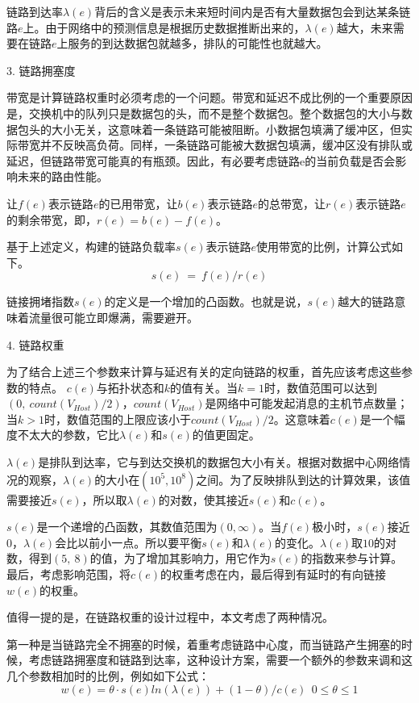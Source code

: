链路到达率$\lambda(e)$背后的含义是表示未来短时间内是否有大量数据包会到达某条链路$e$上。由于网络中的预测信息是根据历史数据推断出来的，$\lambda(e)$越大，未来需要在链路$e$上服务的到达数据包就越多，排队的可能性也就越大。

3. 链路拥塞度

带宽是计算链路权重时必须考虑的一个问题。带宽和延迟不成比例的一个重要原因是，交换机中的队列只是数据包的头，而不是整个数据包。整个数据包的大小与数据包头的大小无关，这意味着一条链路可能被阻断。小数据包填满了缓冲区，但实际带宽并不反映高负荷。同样，一条链路可能被大数据包填满，缓冲区没有排队或延迟，但链路带宽可能真的有瓶颈。因此，有必要考虑链路e的当前负载是否会影响未来的路由性能。

让$f(e)$表示链路$e$的已用带宽，让$b(e)$表示链路$e$的总带宽，让$r(e)$表示链路$e$的剩余带宽，即，$r(e)=b(e)-f(e)$。

基于上述定义，构建的链路负载率$s(e)$表示链路$e$使用带宽的比例，计算公式如下。
$$s(e)\ =\ f(e)/r(e)$$

链接拥堵指数$s(e)$的定义是一个增加的凸函数。也就是说，$s(e)$越大的链路意味着流量很可能立即爆满，需要避开。

4. 链路权重

为了结合上述三个参数来计算与延迟有关的定向链路的权重，首先应该考虑这些参数的特点。
$c(e)$与拓扑状态和$k$的值有关。当$k=1$时，数值范围可以达到$(0,\ count(V_{Host})/2)，count(V_{Host})$是网络中可能发起消息的主机节点数量；当$k>1$时，数值范围的上限应该小于$count(V_{Host})/2$。这意味着$c(e)$是一个幅度不太大的参数，它比$\lambda(e)$和$s(e)$的值更固定。

$\lambda(e)$是排队到达率，它与到达交换机的数据包大小有关。根据对数据中心网络情况的观察，$\lambda(e)$的大小在$({10}^5,{10}^8)$之间。为了反映排队到达的计算效果，该值需要接近$s(e)$，所以取$\lambda(e)$的对数，使其接近$s(e)$和$c(e)$。

$s(e)$是一个递增的凸函数，其数值范围为$\left(0,\infty\right)$。当$f(e)$极小时，$s(e)$接近0，$\lambda(e)$会比以前小一点。所以要平衡$s(e)$和$\lambda(e)$的变化。$\lambda(e)$取$10$的对数，得到$\left(5,\ 8\right)$的值，为了增加其影响力，用它作为$s(e)$的指数来参与计算。最后，考虑影响范围，将$c(e)$的权重考虑在内，最后得到有延时的有向链接$w(e)$的权重。

值得一提的是，在链路权重的设计过程中，本文考虑了两种情况。

第一种是当链路完全不拥塞的时候，着重考虑链路中心度，而当链路产生拥塞的时候，考虑链路拥塞度和链路到达率，这种设计方案，需要一个额外的参数来调和这几个参数相加时的比例，例如如下公式：
$$w(e)=\theta \cdot s(e)ln(λ(e)) +(1- \theta )/c(e) \ \  0 \le \theta \le 1$$

